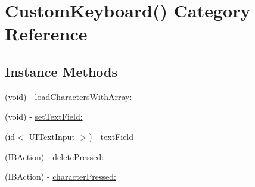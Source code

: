 \hypertarget{category_custom_keyboard_07_08}{\section{Custom\-Keyboard() Category Reference}
\label{category_custom_keyboard_07_08}
}
\subsection*{Instance Methods}
\begin{DoxyCompactItemize}
\item 
(void) -\/ \hyperlink{category_custom_keyboard_07_08_a03a4f3a13e70bf330aa8bd47f9e96d2f}{load\-Characters\-With\-Array\-:}
\item 
(void) -\/ \hyperlink{category_custom_keyboard_07_08_a1c83fdfe9a1fb3670f5093a96125fd96}{set\-Text\-Field\-:}
\item 
(id$<$ U\-I\-Text\-Input $>$) -\/ \hyperlink{category_custom_keyboard_07_08_a3d6fdd1edb1ada37268d74125482884b}{text\-Field}
\item 
(I\-B\-Action) -\/ \hyperlink{category_custom_keyboard_07_08_a9c32a88fe65aa030c653a7829e1cbc9f}{delete\-Pressed\-:}
\item 
(I\-B\-Action) -\/ \hyperlink{category_custom_keyboard_07_08_a6a3bef91830f24bd1a49fbc9149fb5e4}{character\-Pressed\-:}
\end{DoxyCompactItemize}


